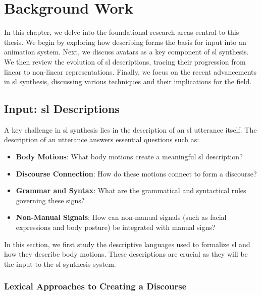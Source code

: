 \documentclass[../../main.tex]{subfiles}
\begin{document}
\chapter{Background Work}
\label{ch:background_work}

In this chapter, we delve into the foundational research areas central to this thesis. We begin by exploring how describing forms the basis for input into an animation system. Next, we discuss avatars as a key component of \gls{sl} synthesis. We then review the evolution of \gls{sl} descriptions, tracing their progression from linear  to non-linear representations. Finally, we focus on the recent advancements in \gls{sl} synthesis, discussing various techniques and their implications for the field.

\section{Input: \gls{sl} Descriptions}
\label{ch:background_work:sign_language_descriptions}

A key challenge in \gls{sl} synthesis lies in the description of an \gls{sl} \gls{utterance} itself. The description of an \gls{utterance} answers essential questions such as:

\begin{itemize}
  \item \textbf{Body Motions}: What body motions create a meaningful \gls{sl} description?
  \item \textbf{Discourse Connection}: How do these motions connect to form a discourse?
  \item \textbf{Grammar and Syntax}: What are the grammatical and syntactical rules governing these signs?
  \item \textbf{Non-Manual Signals}: How can non-manual signals (such as facial expressions and body posture) be integrated with manual signs?
\end{itemize}

In this section, we first study the descriptive languages used to formalize \gls{sl} and how they describe body motions. These descriptions are crucial as they will be the input to the \gls{sl} synthesis system.

\subsection{Lexical Approaches to Creating a Discourse}
\label{ch:background_work:sign_language_descriptions:lexical_approaches}
\end{document}
